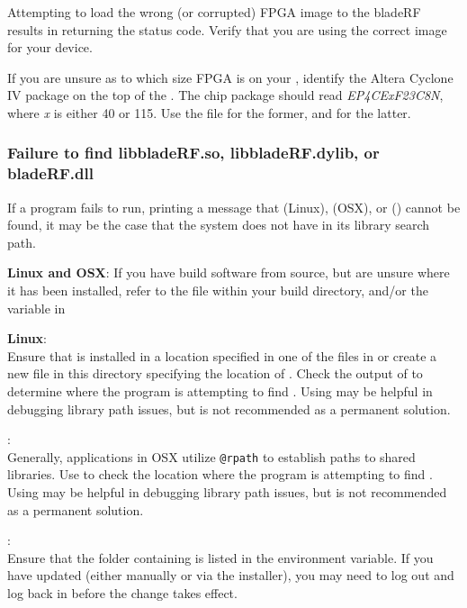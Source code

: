 Attempting to load the wrong (or corrupted) FPGA image to the bladeRF results
in \libbladerf returning the  status code. Verify
that you are using the correct image for your device.

If you are unsure as to which size FPGA is on your \bladerf, identify the
Altera Cyclone IV package on the top of the \bladerf. The chip package should
read \textit{EP4CExF23C8N}, where \textit{x} is either 40 or 115. Use the
 file for the former, and  for the latter.

\subsubsection{Failure to find libbladeRF.so, libbladeRF.dylib, or bladeRF.dll}

If a program fails to run, printing a message that  (Linux),
 (OSX), or  (\windows) cannot be found,
it may be the case that the system does not have \libbladerf in its library search path.

\textbf{Linux and OSX}:
If you have build \bladerf software from source, but are unsure where it has
been installed, refer to the  file within your
build directory, and/or the  variable in

\textbf{Linux}: \\
Ensure that \libbladerf is installed in a location specified in one of the files
in  or create a new file in this directory specifying the
location of \libbladerf. Check the output of  to
determine where the program is attempting to find \libbladerf. Using
 may be helpful in debugging library path issues, but
is not recommended as a permanent solution.


\textbf{\osx}: \\
Generally, applications in OSX utilize \texttt{@rpath} to establish paths to
shared libraries. Use  to check the location where
the program is attempting to find \libbladerf. Using 
may be helpful in debugging library path issues, but is not recommended as a
permanent solution.

\textbf{\windows}: \\
Ensure that the folder containing  is listed in the 
environment variable. If you have updated  (either manually or via the
\bladerf installer), you may need to log out and log back in before the change
takes effect.
